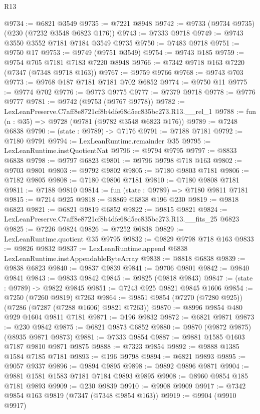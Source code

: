 \begin{lexlean}{R13}
\begin{coremodule}
@9734 := @6821 @3549
@9735 := @7221 @8948
@9742 := @9733 (@9734 @9735) (@230 (@7232 @3548 @6823 @176))
@9743 := @7333 @9718
@9749 := @9743 @3550 @3552 @7181 @7184 @3549 @9735
@9750 := @7483 @9718
@9751 := @9750 @17
@9753 := @9749 (@9751 @3549)
@9754 := @9743 @185
@9759 := @9754 @705 @7181 @7183 @7220 @8948
@9766 := @7342 @9718 @163 @7220 (@7347 (@7348 @9718 @163))
@9767 := @9759 @9766
@9768 := @9743 @703
@9773 := @9768 @187 @7181 @7181 @702 @6852
@9774 := @9750 @11
@9775 := @9774 @702
@9776 := @9773 @9775
@9777 := @7379 @9718
@9778 := @9776 @9777
@9781 := @9742 (@9753 (@9767 @9778))
@9782 := LexLeanPreserve.C7aff8e8721cf8b4dfe68d5ec835bc273.R13.__rel_1
@9788 := fun (n : @35) => @9728 (@9781 (@9782 @3548 @6823 @176))
@9789 := @7248 @6838
@9790 := (state : @9789) -> @7176
@9791 := @7188 @7181
@9792 := @7180 @9791
@9794 := LexLeanRuntime.remainder @35
@9795 := LexLeanRuntime.instQuotientNat
@9796 := @9794 @9795
@9797 := @8833 @6838
@9798 := @9797 @6823
@9801 := @9796 @9798 @718 @163
@9802 := @9703 @9801
@9803 := @9792 @9802
@9805 := @7180 @9803 @7181
@9806 := @7182 @9805
@9808 := @7180 @9806 @7181
@9810 := @7180 @9808 @7181
@9811 := @7188 @9810
@9814 := fun (state : @9789) => @7180 @9811 @7181
@9815 := @7214 @925
@9818 := @8869 @6838 @196 @230
@9819 := @9818 @6823
@9821 := @6821 @9819 @6852
@9822 := @9815 @9821
@9824 := LexLeanPreserve.C7aff8e8721cf8b4dfe68d5ec835bc273.R13.__fits_25 @6823
@9825 := @7226 @9824
@9826 := @7252 @6838
@9829 := LexLeanRuntime.quotient @35 @9795
@9832 := @9829 @9798 @718 @163
@9833 := @9826 @9832
@9837 := LexLeanRuntime.append @6838 LexLeanRuntime.instAppendableByteArray
@9838 := @8818 @6838
@9839 := @9838 @6823
@9840 := @9837 @9839
@9841 := @9706 @9801
@9842 := @9840 @9841
@9843 := @9833 @9842
@9845 := @9825 (@9818 @9843)
@9847 := (state : @9789) -> @9822 @9845
@9851 := @7243 @925 @9821 @9845 @1606
@9854 := @7250 (@7260 @9819) @7263
@9864 := @9851 @9854 (@7270 (@7280 @925)) (@7286 (@7287 (@7288 @1606) @9821 @7263))
@9870 := @8996 @9854 @480 @929 @1604 @9811 @7181
@9871 := @196 @9832
@9872 := @6821 @9871
@9873 := @230 @9842
@9875 := @6821 @9873 @6852
@9880 := @9870 (@9872 @9875) (@8935 @9871 @9873)
@9881 := @7333 @9854
@9887 := @9881 @1585 @1603 @7187 @9810 @9871 @9875
@9888 := @7323 @9854
@9892 := @9888 @1385 @1584 @7185 @7181
@9893 := @196 @9798
@9894 := @6821 @9893
@9895 := @9057 @9337
@9896 := @9894 @9895
@9898 := @9892 @9896 @9871
@9904 := @9881 @1581 @1583 @7181 @7184 @9893 @9895
@9908 := @8960 @9854 @185 @7181 @9893
@9909 := @230 @9839
@9910 := @9908 @9909
@9917 := @7342 @9854 @163 @9819 (@7347 (@7348 @9854 @163))
@9919 := @9904 (@9910 @9917)

\end{coremodule}
\end{lexlean}
